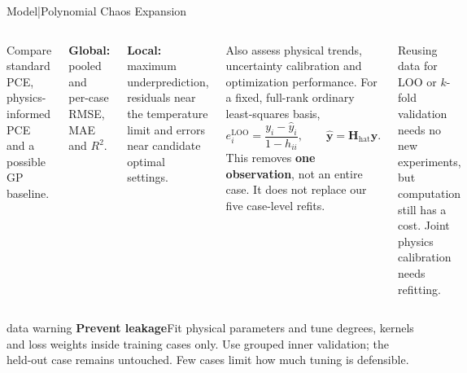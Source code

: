 \begin{frame}{Model\enspace|\enspace Polynomial Chaos Expansion}
  \begin{columns}[T,onlytextwidth]
      \footnotesize
      Compare standard PCE, physics-informed PCE and a possible GP baseline.\par
      \smallskip
      \textbf{Global:} pooled and per-case RMSE, MAE and $R^2$.\par
      \smallskip
      \textbf{Local:} maximum underprediction, residuals near the temperature limit
      and errors near candidate optimal settings.\par
      \smallskip
      Also assess physical trends, uncertainty calibration and optimization performance.
      \footnotesize
      For a fixed, full-rank ordinary least-squares basis,
      \[
        e_i^{\mathrm{LOO}}=\frac{y_i-\widehat y_i}{1-h_{ii}},
        \qquad \widehat{\mathbf y}=\mathbf{H}_{\mathrm{hat}}\mathbf y.
      \]
      This removes \textbf{one observation}, not an entire case. It does not
      replace our five case-level refits.\par
      \smallskip
      Reusing data for LOO or $k$-fold validation needs no new experiments,
      but computation still has a cost. Joint physics calibration needs refitting.
  \end{columns}
  \medskip
  \begin{beamercolorbox}[sep=1.5mm,wd=\textwidth]{data warning}
    \footnotesize
    \textbf{Prevent leakage}\quad Fit physical parameters and tune degrees, kernels
    and loss weights inside training cases only. Use grouped inner validation;
    the held-out case remains untouched. Few cases limit how much tuning is defensible.
  \end{beamercolorbox}
\end{frame}


